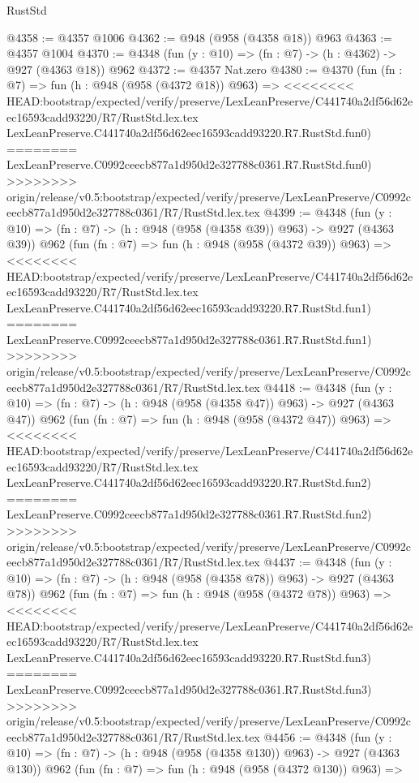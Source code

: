 \begin{lexlean}{RustStd}
\begin{coremodule}
{\begin{coremodule}
{{{{{{{{{{@4358 := @4357 @1006
@4362 := @948 (@958 (@4358 @18)) @963
@4363 := @4357 @1004
@4370 := @4348 (fun (y : @10) => (fn : @7) -> (h : @4362) -> @927 (@4363 @18)) @962
@4372 := @4357 Nat.zero
@4380 := @4370
    (fun (fn : @7) =>
    fun (h : @948 (@958 (@4372 @18)) @963) =>
<<<<<<<< HEAD:bootstrap/expected/verify/preserve/LexLeanPreserve/C441740a2df56d62eec16593cadd93220/R7/RustStd.lex.tex
    LexLeanPreserve.C441740a2df56d62eec16593cadd93220.R7.RustStd.fun0)
========
    LexLeanPreserve.C0992ceecb877a1d950d2e327788c0361.R7.RustStd.fun0)
>>>>>>>> origin/release/v0.5:bootstrap/expected/verify/preserve/LexLeanPreserve/C0992ceecb877a1d950d2e327788c0361/R7/RustStd.lex.tex
@4399 := @4348
    (fun (y : @10) => (fn : @7) -> (h : @948 (@958 (@4358 @39)) @963) -> @927 (@4363 @39))
    @962
    (fun (fn : @7) =>
    fun (h : @948 (@958 (@4372 @39)) @963) =>
<<<<<<<< HEAD:bootstrap/expected/verify/preserve/LexLeanPreserve/C441740a2df56d62eec16593cadd93220/R7/RustStd.lex.tex
    LexLeanPreserve.C441740a2df56d62eec16593cadd93220.R7.RustStd.fun1)
========
    LexLeanPreserve.C0992ceecb877a1d950d2e327788c0361.R7.RustStd.fun1)
>>>>>>>> origin/release/v0.5:bootstrap/expected/verify/preserve/LexLeanPreserve/C0992ceecb877a1d950d2e327788c0361/R7/RustStd.lex.tex
@4418 := @4348
    (fun (y : @10) => (fn : @7) -> (h : @948 (@958 (@4358 @47)) @963) -> @927 (@4363 @47))
    @962
    (fun (fn : @7) =>
    fun (h : @948 (@958 (@4372 @47)) @963) =>
<<<<<<<< HEAD:bootstrap/expected/verify/preserve/LexLeanPreserve/C441740a2df56d62eec16593cadd93220/R7/RustStd.lex.tex
    LexLeanPreserve.C441740a2df56d62eec16593cadd93220.R7.RustStd.fun2)
========
    LexLeanPreserve.C0992ceecb877a1d950d2e327788c0361.R7.RustStd.fun2)
>>>>>>>> origin/release/v0.5:bootstrap/expected/verify/preserve/LexLeanPreserve/C0992ceecb877a1d950d2e327788c0361/R7/RustStd.lex.tex
@4437 := @4348
    (fun (y : @10) => (fn : @7) -> (h : @948 (@958 (@4358 @78)) @963) -> @927 (@4363 @78))
    @962
    (fun (fn : @7) =>
    fun (h : @948 (@958 (@4372 @78)) @963) =>
<<<<<<<< HEAD:bootstrap/expected/verify/preserve/LexLeanPreserve/C441740a2df56d62eec16593cadd93220/R7/RustStd.lex.tex
    LexLeanPreserve.C441740a2df56d62eec16593cadd93220.R7.RustStd.fun3)
========
    LexLeanPreserve.C0992ceecb877a1d950d2e327788c0361.R7.RustStd.fun3)
>>>>>>>> origin/release/v0.5:bootstrap/expected/verify/preserve/LexLeanPreserve/C0992ceecb877a1d950d2e327788c0361/R7/RustStd.lex.tex
@4456 := @4348
    (fun (y : @10) => (fn : @7) -> (h : @948 (@958 (@4358 @130)) @963) -> @927 (@4363 @130))
    @962
    (fun (fn : @7) =>
    fun (h : @948 (@958 (@4372 @130)) @963) =>
}}}}}}}}}}
\end{coremodule}}
\end{coremodule}
\end{lexlean}
